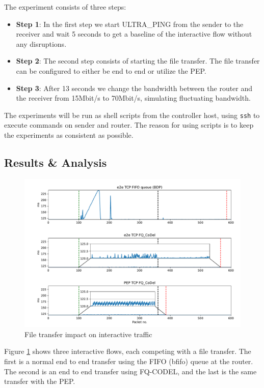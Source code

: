 \documentclass[a4paper,english, 12pt]{report}
\begin{document}
The experiment consists of three steps:

\begin{itemize}
  \item \textbf{Step 1}: In the first step we start ULTRA\_PING from the sender to the receiver and wait 5 seconds to get a baseline of the interactive flow without any disruptions.
  \item \textbf{Step 2}: The second step consists of starting the file transfer. The file transfer can be configured to either be end to end or utilize the PEP.
  \item \textbf{Step 3}: After 13 seconds we change the bandwidth between the router and the receiver from 15Mbit/s to 70Mbit/s, simulating fluctuating bandwidth.
\end{itemize}

The experiments will be run as shell scripts from the controller host, using \verb|ssh| to execute commands on sender and router. The reason for using scripts is to keep the experiments as consistent as possible.

\subsection{Results \& Analysis}

\begin{figure}[h!] %
	\centering
	\includegraphics[scale=0.45]{../diagrams/graphs/final2.pdf}
  	\caption{File transfer impact on interactive traffic}
  	\label{fig:graph1}
\end{figure}

Figure \ref{fig:graph1} shows three interactive flows, each competing with a file transfer. The first is a normal end to end transfer using the FIFO (bfifo) queue at the router. The second is an end to end transfer using FQ-CODEL, and the last is the same transfer with the PEP.\\
\end{document}
